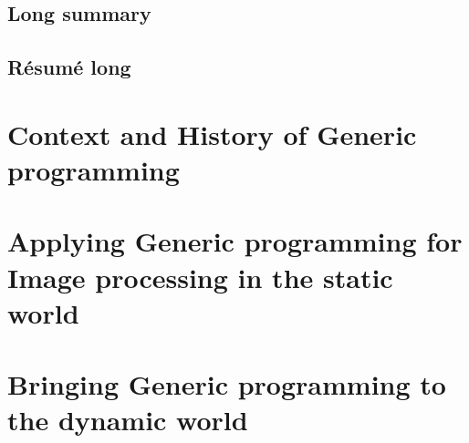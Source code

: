 \documentclass[11pt,a4paper]{book}
\begin{document}
\flyleaf

\cleardoublepage




\cleardoublepage



\cleardoublepage

\chapter*{Long summary}
\label{chap:long_summary}


\cleardoublepage

\chapter*{R\'{e}sum\'{e} long}
\label{chap:resume_long}


\cleardoublepage

\tableofcontents
\label{table.of.contents}

\listoffigures
\label{list.of.figures}

\listoftables
\label{list.of.tables}

\cleardoublepage


\part{Context and History of Generic programming}
\label{part:context.history}




\cleardoublepage



\cleardoublepage


\part{Applying Generic programming for Image processing in the static world}
\label{part:static.world}




\cleardoublepage



\cleardoublepage


\part{Bringing Generic programming to the dynamic world}
\label{part:dynamic.world}
\end{document}
